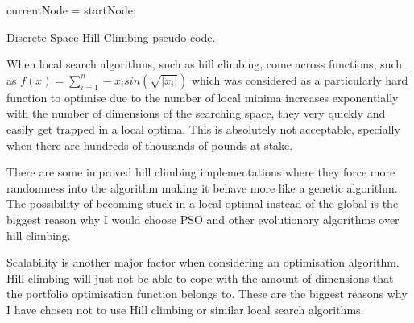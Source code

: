     \begin{algorithm}[H] \label{eq:hill}
      currentNode = startNode; \\
      \caption{Discrete Space Hill Climbing pseudo-code.}
    \end{algorithm}
  When local search algorithms, such as hill climbing, come across functions, such as $f(x)=\sum\limits_{i=1}^n -x_i sin(\sqrt{|x_i|})$ which was considered \cite{localmin} as a particularly hard function to optimise due to the number of local minima increases exponentially with the number of dimensions of the searching space, they very quickly and easily get trapped in a local optima. This is absolutely not acceptable, specially when there are hundreds of thousands of pounds at stake. 

  There are some improved hill climbing implementations \cite{hill3} where they force more randomness into the algorithm making it behave more like a genetic algorithm. The possibility of becoming stuck in a local optimal instead of the global is the biggest reason why I would choose PSO and other evolutionary algorithms over hill climbing. 

  Scalability is another major factor when considering an optimisation algorithm. Hill climbing will just not be able to cope with the amount of dimensions that the portfolio optimisation function belongs to. These are the biggest reasons why I have chosen not to use Hill climbing or similar local search algorithms. 



